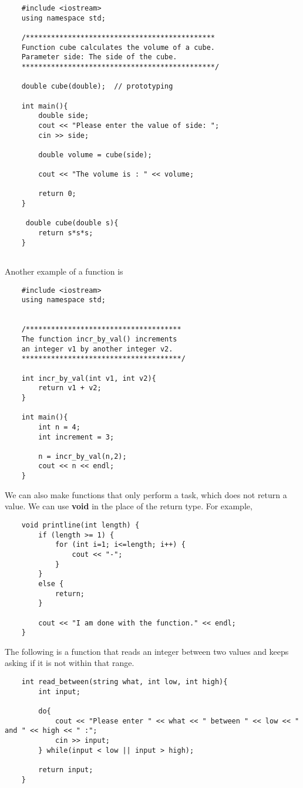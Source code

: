 \documentclass[]{article}
\begin{document}
\begin{lstlisting}
 	#include <iostream>
 	using namespace std;
 	
 	/*********************************************
 	Function cube calculates the volume of a cube.
 	Parameter side: The side of the cube.
 	**********************************************/
 	
 	double cube(double);  // prototyping
 	
 	int main(){
 		double side;
 		cout << "Please enter the value of side: ";
 		cin >> side;
 		
 		double volume = cube(side);
 		
 		cout << "The volume is : " << volume;
 		
 		return 0;
 	}
 	
 	 double cube(double s){
 		return s*s*s;
 	}
 	
\end{lstlisting}\bigbreak

Another example of a function is

\begin{lstlisting}
	#include <iostream>
	using namespace std;
	
	
	/*************************************
	The function incr_by_val() increments
	an integer v1 by another integer v2.
	**************************************/
	
	int incr_by_val(int v1, int v2){	
		return v1 + v2;	
	}
	
	int main(){
		int n = 4;
		int increment = 3;
		
		n = incr_by_val(n,2);
		cout << n << endl;
	}	
\end{lstlisting}\bigbreak


We can also make functions that only perform a task, which does not return a value. We can use \textbf{void} in the place of the return type. For example,

\begin{lstlisting}
	void printline(int length) {
		if (length >= 1) {
			for (int i=1; i<=length; i++) {
				cout << "-";
			}
		}
		else {
			return;	
		}
	
		cout << "I am done with the function." << endl;
	}
\end{lstlisting}\bigbreak


The following is a function that reads an integer between two values and keeps asking if it is not within that range.

\begin{lstlisting}
	int read_between(string what, int low, int high){
		int input;
		
		do{
			cout << "Please enter " << what << " between " << low << " and " << high << " :";
			cin >> input;
		} while(input < low || input > high);
		
		return input;
	}
\end{lstlisting}
\bigbreak
\end{document}
